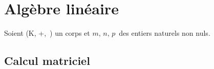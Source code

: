 \section{Algèbre linéaire}

\vspace{0.4cm}

\begin{center}
    Soient (K, +,\ \x) un corps et $m,\, n,\, p\,$ des entiers naturels non nuls.
\end{center}

\vspace{0.4cm}

\subsection{Calcul matriciel}

\vspace{0.5cm}

